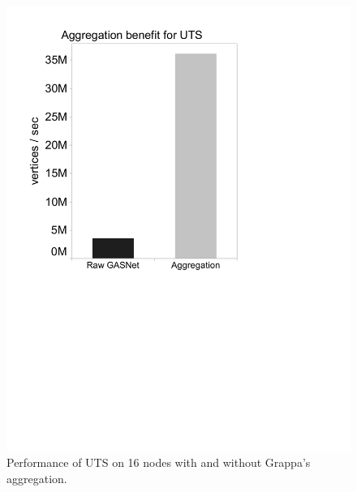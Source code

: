 \begin{figure}[htb]
\begin{center}
  \includegraphics[width=0.95\columnwidth]{figs/no_aggregation_uts.pdf}
\begin{minipage}{0.95\columnwidth}
  \caption{\label{fig:no-aggregation-uts} Performance of UTS on 16
      nodes with and without Grappa's aggregation.}
\end{minipage}
\vspace{-3ex}
\end{center}
\end{figure}

